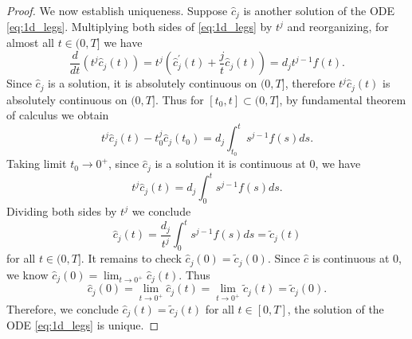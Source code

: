 \documentclass[10pt,a4paper]{amsart}
\newcommand{\derivative}[1]{#1^{\prime}}
\newcommand{\pr}[1]{ \left( #1 \right) }
\begin{document}
\begin{proof}
    We now establish uniqueness. 
    Suppose $\hat{c}_j$ is another solution of the ODE \eqref{eq:1d_legs}. 
    Multiplying both sides of \eqref{eq:1d_legs} by %
    $t^j$ and reorganizing, for almost all $t\in(0,T]$ we have
    \[
        \frac{d}{dt} (t^j\hat{c}_j(t)) 
        = t^j \pr{ \derivative{\hat{c}}_j(t) + \frac{j}{t} \hat{c}_j(t) } 
        = d_j t^{j-1} f(t) .
    \]
    Since $\hat{c}_j$ is a solution, it is absolutely continuous on $(0,T]$, therefore $t^j\hat{c}_j(t)$ is absolutely continuous on $(0,T]$. 
    Thus for $[t_0,t] \subset (0,T]$, 
    by fundamental theorem of calculus we obtain
    \[
        t^j \hat{c}_j(t) - t_0^j \hat{c}_j(t_0) = d_j \int_{t_0}^t s^{j-1} f(s) ds.
    \]
    Taking limit $t_0 \to 0^+$, since $\hat{c}_j$ is a solution it is continuous at $0$, we have
    \[
        t^j \hat{c}_j(t) = d_j \int_{0}^t s^{j-1} f(s) ds.
    \]
    Dividing both sides by $t^j$ we conclude
    \begin{equation*}
       \hat{c}_j(t) = \frac{d_j}{t^j} \int^t_0 s^{j-1} f(s)ds = \tilde{c}_j(t) %
    \end{equation*}
    for all $t \in (0,T]$. 
    It remains to check $\hat{c}_j(0)=\tilde{c}_j(0)$. 
    Since $\hat{c}$ is continuous at $0$, we know $\hat{c}_j(0)=\lim_{t\to0^+}\hat{c}_j(t)$. Thus
     \begin{equation*}
        \hat{c}_j(0)
        = \lim_{t\to0^+} \hat{c}_j(t)
        = \lim_{t\to0^+} \tilde{c}_j(t)
        = \tilde{c}_j(0). 
    \end{equation*}
    Therefore, we conclude $\hat{c}_j(t) = \tilde{c}_j(t)$ for all $t\in[0,T]$, 
     the solution of the ODE \eqref{eq:1d_legs} is unique. 
    

\end{proof}
\end{document}
